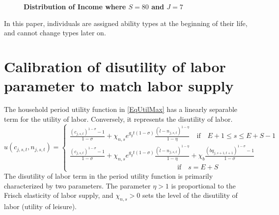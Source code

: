 \documentclass[letterpaper,12pt]{article}
\theoremstyle{definition}
\begin{document}
    \begin{figure}[htb]\centering \captionsetup{width=4.0in}
      \caption{\label{FigAbility}\textbf{Distribution of Income where $S=80$ and $J=7$}}
    \end{figure}

  In this paper, individuals are assigned ability types at the beginning of their life, and cannot change types later on.
  \clearpage


\newpage
\section{Calibration of disutility of labor parameter to match labor supply}\label{AppDisutilLab}

  \setcounter{equation}{0}

  The household period utility function in \eqref{EqUtilMax} has a linearly separable term for the utility of labor. Conversely, it represents the disutility of labor.
  \begin{equation}\label{EqPerUtil}
    u\left(c_{j,s,t},n_{j,s,t}\right) =
      \begin{cases}
        \frac{\left(c_{j,s,t}\right)^{1-\sigma} - 1}{1-\sigma} + \chi_{n,s} e^{g_y t(1-\sigma)}\frac{(\tilde{l}-n_{j,s,t})^{1-\eta}}{1-\eta} \quad\text{if}\quad E+1\leq s \leq E+S-1 \\
        \frac{\left(c_{j,s,t}\right)^{1-\sigma} - 1}{1-\sigma} + \chi_{n,s} e^{g_y t(1-\sigma)}\frac{(\tilde{l}-n_{j,s,t})^{1-\eta}}{1-\eta} + \chi_b\frac{\left(bq_{j,s+1,t+1}\right)^{1-\sigma} - 1}{1-\sigma} \\
        \quad\quad\quad\quad\quad\quad\quad\quad\quad\quad\quad\quad\quad\quad\quad\:\:\:\text{if}\quad s=E+S
      \end{cases}
  \end{equation}
  The disutility of labor term in the period utility function is primarily characterized by two parameters. The parameter $\eta>1$ is proportional to the Frisch elasticity of labor supply, and $\chi_{n,s}>0$ sets the level of the disutility of labor (utility of leisure).
\end{document}
